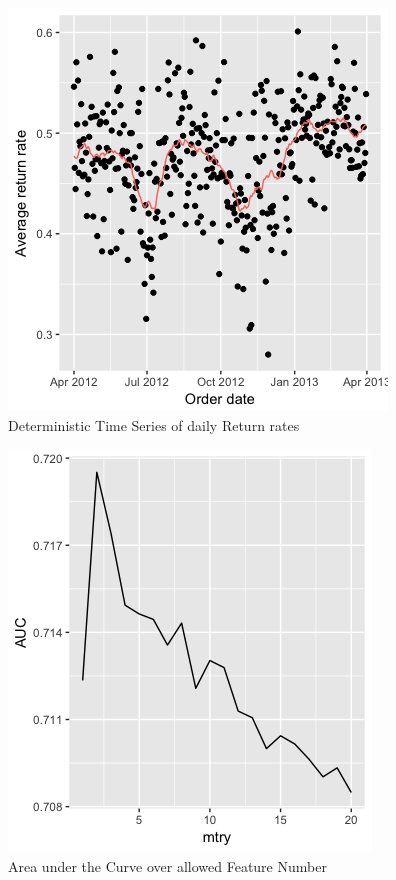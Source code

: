 \documentclass[12pt]{article}
\begin{document}
\begin{appendices}
\thispagestyle{empty}
\begin{figure}[b]
    \begin{scriptsize}
     \includegraphics[scale = 0.6]{order_date.png}
 	\end{scriptsize}
      \begin{center}
    \caption{Deterministic Time Series of daily Return rates}
          \label{fig:od}
 		\end{center}
  \end{figure}
		
\thispagestyle{empty}		
\begin{figure}[H]
   \begin{scriptsize}
    \includegraphics[scale = 0.7]{parameter.png}
 	\end{scriptsize}
      \begin{center}
    \caption{Area under the Curve over allowed Feature Number}
          \label{fig:parameter}
 		\end{center}  
  \end{figure}
\clearpage
\newpage

\end{appendices}
\end{document}
